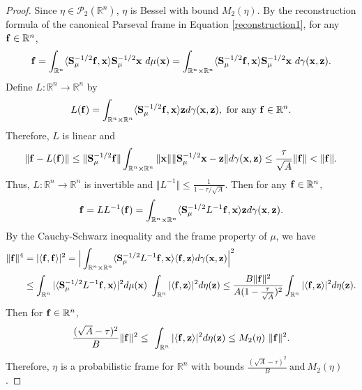 \documentclass{amsart}
\numberwithin{equation}{section}
\theoremstyle{plain}
\theoremstyle{definition}
\begin{document}
\begin{proof}
Since $\eta \in \mathcal{P}_2(\mathbb{R}^n)$, $\eta$ is Bessel with bound  $M_2(\eta)$. By the reconstruction formula of the canonical Parseval frame in Equation \eqref{reconstruction1}, for any ${\bf f} \in \mathbb{R}^n$,
\begin{equation*}
   {\bf f}=  \int_{\mathbb{R}^n} \langle {\bf S}_\mu^{-1/2} {\bf f}, {\bf x} \rangle {\bf S}_\mu^{-1/2} {\bf x}  \ d\mu({\bf x}) = \int_{\mathbb{R}^n \times \mathbb{R}^n} \langle {\bf S}_\mu^{-1/2} {\bf f}, {\bf x} \rangle {\bf S}_\mu^{-1/2} {\bf x}  \ d\gamma({\bf x}, {\bf z}).
\end{equation*}
Define $L: \mathbb{R}^n \rightarrow \mathbb{R}^n$ by 
$$
L({\bf f}) = \int_{\mathbb{R}^n \times \mathbb{R}^n} \langle {\bf S}_\mu^{-1/2}{\bf f}, {\bf x} \rangle {\bf z} d \gamma({\bf x},{\bf z}), \ \text{for any} \ {\bf f} \in \mathbb{R}^n.
$$
Therefore, $L$ is linear and 
\begin{equation*}
    \Vert {\bf f} -L({\bf f}) \Vert \leq \Vert {\bf S}_\mu^{-1/2} {\bf f}  \Vert \int_{\mathbb{R}^n  \times \mathbb{R}^n} \Vert {\bf x} \Vert \Vert  {\bf S}_\mu^{-1/2} {\bf x}- {\bf z}  \Vert d \gamma({\bf x}, {\bf z})  \leq \frac{\tau}{\sqrt{A}}  \Vert  {\bf f} \Vert <  \Vert  {\bf f} \Vert.
\end{equation*}
Thus, $L: \mathbb{R}^n \rightarrow \mathbb{R}^n$ is invertible and $\Vert L^{-1} \Vert \leq \frac{1}{1-\tau / \sqrt{A}}$.
Then for any ${\bf f} \in \mathbb{R}^n$, 
\begin{equation*}
    {\bf f} = LL^{-1}({\bf f}) =  \int_{\mathbb{R}^n \times \mathbb{R}^n} \langle {\bf S}_\mu^{-1/2}L^{-1} {\bf f}, {\bf x} \rangle {\bf z} d \gamma({\bf x},{\bf z}).
\end{equation*}
By the Cauchy-Schwarz inequality and the frame property of $\mu$, we have
\begin{equation*}
\begin{split}
   \Vert {\bf f} \Vert^4 &=  |\langle {\bf f}, {\bf f} \rangle|^2 = \Big \vert \int_{\mathbb{R}^n \times \mathbb{R}^n} \langle {\bf S}_\mu^{-1/2}L^{-1} {\bf f}, {\bf x} \rangle \langle  {\bf f}, {\bf z} \rangle d \gamma({\bf x},{\bf z})  \Big  \vert^2 \\
    & \leq \int_{\mathbb{R}^n} |\langle {\bf S}_\mu^{-1/2} L^{-1}{\bf f}, {\bf x} \rangle|^2 d\mu({\bf x})  \ \int_{\mathbb{R}^n} |\langle {\bf f}, {\bf z} \rangle|^2 d\eta({\bf z}) \leq \frac{B \Vert {\bf f} \Vert^2}{A (1-\frac{\tau}{\sqrt{A}})^2 }   \int_{\mathbb{R}^n} |\langle {\bf f}, {\bf z} \rangle|^2 d\eta({\bf z}).
\end{split}
\end{equation*}
Then for ${\bf f} \in \mathbb{R}^n$, 
 $$ 
 \frac{(\sqrt{A}-\tau)^2}{B}    \Vert  {\bf f} \Vert^2  \leq  \ \int_{\mathbb{R}^n} |\langle {\bf f}, {\bf z} \rangle|^2 d\eta({\bf z}) \leq M_2(\eta) \ \Vert  {\bf f} \Vert^2.
 $$ 
 Therefore, $\eta$ is a probabilistic frame for $\mathbb{R}^n$ with bounds $\frac{(\sqrt{A}- \tau)^2}{B}  \ \text{and} \ M_2(\eta)$.
\end{proof}
\end{document}
